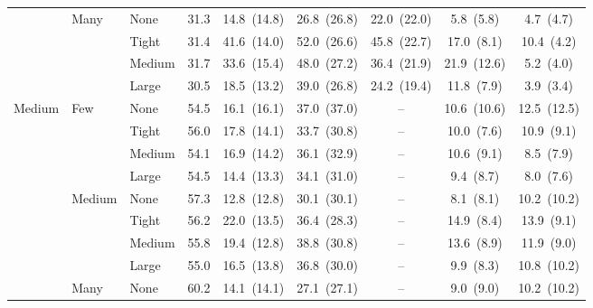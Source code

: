 \begin{table}[htbp]
{\begin{tabular}{lll c ccccc}
 & \multirow{4}{*}{\small Many} & {\small None} & 31.3 & 14.8~{\scriptsize(14.8)} & 26.8~{\scriptsize(26.8)} & 22.0~{\scriptsize(22.0)} & 5.8~{\scriptsize(5.8)} & 4.7~{\scriptsize(4.7)} \\
 &  & {\small Tight} & 31.4 & 41.6~{\scriptsize(14.0)} & 52.0~{\scriptsize(26.6)} & 45.8~{\scriptsize(22.7)} & 17.0~{\scriptsize(8.1)} & 10.4~{\scriptsize(4.2)} \\
 &  & {\small Medium} & 31.7 & 33.6~{\scriptsize(15.4)} & 48.0~{\scriptsize(27.2)} & 36.4~{\scriptsize(21.9)} & 21.9~{\scriptsize(12.6)} & 5.2~{\scriptsize(4.0)} \\
 &  & {\small Large} & 30.5 & 18.5~{\scriptsize(13.2)} & 39.0~{\scriptsize(26.8)} & 24.2~{\scriptsize(19.4)} & 11.8~{\scriptsize(7.9)} & 3.9~{\scriptsize(3.4)} \\
\midrule
\multirow{12}{*}{\small Medium} & \multirow{4}{*}{\small Few} & {\small None} & 54.5 & 16.1~{\scriptsize(16.1)} & 37.0~{\scriptsize(37.0)} & -- & 10.6~{\scriptsize(10.6)} & 12.5~{\scriptsize(12.5)} \\
 &  & {\small Tight} & 56.0 & 17.8~{\scriptsize(14.1)} & 33.7~{\scriptsize(30.8)} & -- & 10.0~{\scriptsize(7.6)} & 10.9~{\scriptsize(9.1)} \\
 &  & {\small Medium} & 54.1 & 16.9~{\scriptsize(14.2)} & 36.1~{\scriptsize(32.9)} & -- & 10.6~{\scriptsize(9.1)} & 8.5~{\scriptsize(7.9)} \\
 &  & {\small Large} & 54.5 & 14.4~{\scriptsize(13.3)} & 34.1~{\scriptsize(31.0)} & -- & 9.4~{\scriptsize(8.7)} & 8.0~{\scriptsize(7.6)} \\
 & \multirow{4}{*}{\small Medium} & {\small None} & 57.3 & 12.8~{\scriptsize(12.8)} & 30.1~{\scriptsize(30.1)} & -- & 8.1~{\scriptsize(8.1)} & 10.2~{\scriptsize(10.2)} \\
 &  & {\small Tight} & 56.2 & 22.0~{\scriptsize(13.5)} & 36.4~{\scriptsize(28.3)} & -- & 14.9~{\scriptsize(8.4)} & 13.9~{\scriptsize(9.1)} \\
 &  & {\small Medium} & 55.8 & 19.4~{\scriptsize(12.8)} & 38.8~{\scriptsize(30.8)} & -- & 13.6~{\scriptsize(8.9)} & 11.9~{\scriptsize(9.0)} \\
 &  & {\small Large} & 55.0 & 16.5~{\scriptsize(13.8)} & 36.8~{\scriptsize(30.0)} & -- & 9.9~{\scriptsize(8.3)} & 10.8~{\scriptsize(10.2)} \\
 & \multirow{4}{*}{\small Many} & {\small None} & 60.2 & 14.1~{\scriptsize(14.1)} & 27.1~{\scriptsize(27.1)} & -- & 9.0~{\scriptsize(9.0)} & 10.2~{\scriptsize(10.2)} \\

\end{tabular}}
\end{table}

